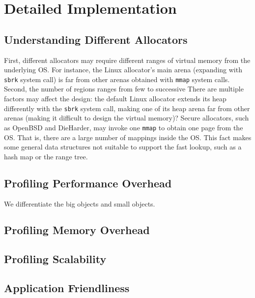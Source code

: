 \section{Detailed Implementation}

\label{sec:implement}





\subsection{Understanding Different Allocators}

\label{sec:understandingallocators}


 First, different allocators may require different ranges of virtual memory from the underlying OS. For instance, the Linux allocator's main arena (expanding with \texttt{sbrk} system call) is far from other arenas obtained with \texttt{mmap} system calls. Second, the number of regions ranges from few to successive   
There are multiple factors may affect the design: the default Linux allocator extends its heap differently with the \texttt{sbrk} system call, making one of its heap arena far from other arenas (making it difficult to design the virtual memory)? Secure allocators, such as OpenBSD and DieHarder, may invoke one \texttt{mmap} to obtain one page from the OS. That is, there are a large number of mappings inside the OS. This fact makes some general data structures not suitable to support the fast lookup, such as a hash map or the range tree.
\subsection{Profiling Performance Overhead}

We differentiate the big objects and small objects. 

\subsection{Profiling Memory Overhead}

\subsection{Profiling Scalability}

\subsection{Application Friendliness}

